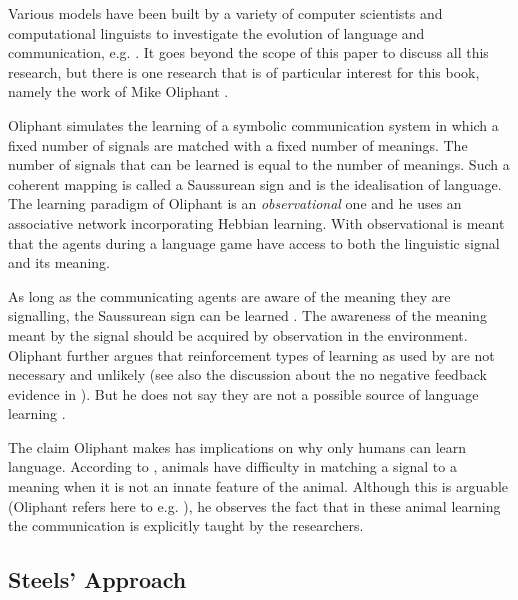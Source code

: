 

Various models have been built by a variety of computer scientists and computational linguists to investigate the evolution of language and communication, e.g. \citep{cangelosiparisi:1998,kirby:1997,maclennan:1991,oliphant:1997,wernerdyer:1991}. It goes beyond the scope of this paper to discuss all this research, but there is one research that is of particular interest for this book, namely the work of Mike Oliphant \citep{oliphant:1997,oliphant:1998,oliphant:2000}.

Oliphant simulates the learning of a symbolic communication system in which a fixed number of signals are matched with a fixed number of meanings. The number of signals that can be learned is equal to the number of meanings. Such a coherent mapping is called a Saussurean sign \citep{saussure:1974} and is the idealisation of language. The learning paradigm of Oliphant is an {\em observational} one and he uses an associative network incorporating Hebbian learning. With observational is meant that the agents during a language game have access to both the linguistic signal and its meaning.

As long as the communicating agents are aware of the meaning they are signalling, the Saussurean sign can be learned \citep{oliphant:1997,oliphant:2000}. The awareness of the meaning meant by the signal should be acquired by observation in the environment. Oliphant further argues that reinforcement types of learning as used by \citep{yancostein,steels:1996a} are not necessary and unlikely (see also the discussion about the no negative feedback evidence in ). But he does not say they are not a possible source of language learning \citep{oliphant:2000}.

The claim Oliphant makes has implications on why only humans can learn language. According to \citet{oliphant:1998}, animals have difficulty in matching a signal to a meaning when it is not an innate feature of the animal. Although this is arguable (Oliphant refers here to e.g. \citep{gardners:1969,premack:1971}), he observes the fact that in these animal learning the communication is explicitly taught by the researchers.


\subsection{Steels' Approach}\label{s:intro:th}

